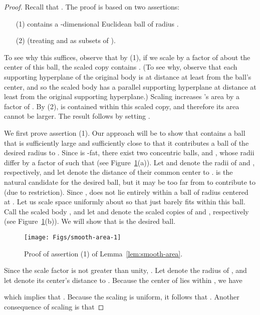 \documentclass[11pt]{article}   \usepackage[letterpaper,hmargin=2.1cm,vmargin=3cm]{geometry}
\begin{document}
{\SmoothAreaStmt*}
\begin{proof}
Recall that . The proof is based on two assertions: 
\begin{enumerate}
\setlength{\itemsep}{-0.5ex}\setlength{\parsep}{0pt}\item[(1)]  contains a -dimensional Euclidean ball of radius .

\item[(2)]  (treating  and  as subsets of ).
\end{enumerate}
To see why this suffices, observe that by (1), if we scale  by a factor of  about the center of this ball, the scaled copy contains . (To see why, observe that each supporting hyperplane of the original body is at distance at least  from the ball's center, and so the scaled body has a parallel supporting hyperplane at distance at least  from the original supporting hyperplane.) Scaling increases 's area by a factor of . By (2),  is contained within this scaled copy, and therefore its area cannot be larger. The result follows by setting .

We first prove assertion (1). Our approach will be to show that  contains a ball that is sufficiently large and sufficiently close to  that it contributes a ball of the desired radius to . Since  is -fat, there exist two concentric balls,  and , whose radii differ by a factor of  such that  (see Figure~\ref{fig:smooth-area-1}(a)). Let  and  denote the radii of  and , respectively, and let  denote the distance of their common center to .  is the natural candidate for the desired ball, but it may be too far from  to contribute to  (due to restriction). Since ,  does not lie entirely within a ball of radius  centered at . Let us scale space uniformly about  so that  just barely fits within this ball. Call the scaled body , and let  and  denote the scaled copies of  and , respectively (see Figure~\ref{fig:smooth-area-1}(b)). We will show that  is the desired ball. 

\begin{figure}[htbp]
  \centerline{\texttt{[image: Figs/smooth-area-1]}}
  \caption{Proof of assertion (1) of Lemma~\ref{lem:smooth-area}.}
  \label{fig:smooth-area-1}
\end{figure}


Since the scale factor is not greater than unity, . Let  denote the radius of , and let   denote its center's distance to . Because the center of  lies within , we have

which implies that . Because the scaling is uniform, it follows that . Another consequence of scaling is that


\end{proof}
\end{document}
